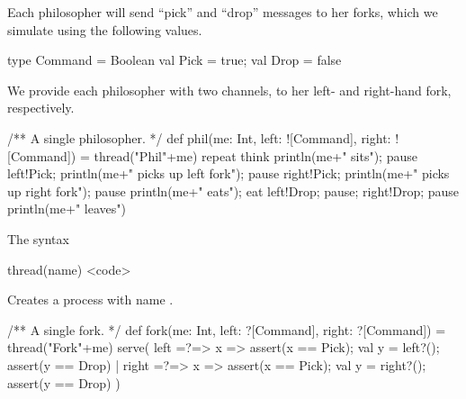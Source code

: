 \documentclass[notes,color]{sepslide0}
\begin{document}

\begin{slide}

Each philosopher will send ``pick'' and ``drop'' messages to her forks, which
we simulate using the following values.
%
\begin{scala}
  type Command = Boolean
  val Pick = true; val Drop = false
\end{scala}
\end{slide}


\begin{slide}

We provide each philosopher with two channels, to her left- and right-hand
fork, respectively.  
\begin{scala}
  /** A single philosopher. */
  def phil(me: Int, left: ![Command], right: ![Command]) = thread("Phil"+me){
    repeat{
      think
      println(me+" sits"); pause
      left!Pick; println(me+" picks up left fork"); pause
      right!Pick; println(me+" picks up right fork"); pause
      println(me+" eats"); eat
      left!Drop; pause; right!Drop; pause
      println(me+" leaves")
    }
  }
\end{scala}
\end{slide}


\begin{selfnote}
The syntax 
\begin{scala}
thread(name){ <code> }
\end{scala}
Creates a process with name .
\end{selfnote}


\begin{slide}

\begin{scala}
  /** A single fork. */
  def fork(me: Int, left: ?[Command], right: ?[Command]) = thread("Fork"+me){
    serve(
      left =?=> { 
        x => assert(x == Pick); val y = left?(); assert(y == Drop) 
      }
      | 
      right =?=> { 
        x => assert(x == Pick); val y = right?(); assert(y == Drop) 
      }
    )
  }
\end{scala}
\end{slide}

\end{document}
